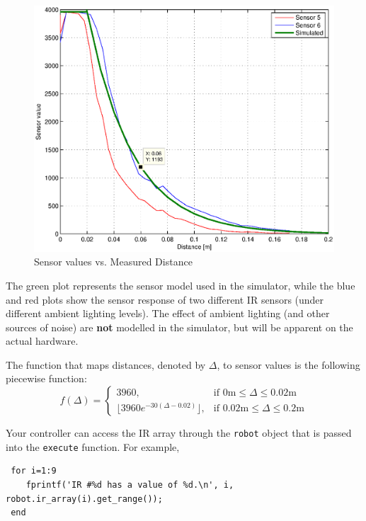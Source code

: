 \documentclass[10pt]{article}
\begin{document}
\begin{figure}[h]
 \centering
 \includegraphics[scale=0.5]{./ir_actual.eps}
 \caption{Sensor values vs. Measured Distance}
 \label{fig:irvalues}
\end{figure}

The green plot represents the sensor model used in the simulator, while the blue and red plots show the sensor response of two different IR sensors (under different ambient lighting levels). The effect of ambient lighting (and other sources of noise) are \textbf{not} modelled in the simulator, but will be apparent on the actual hardware.

The function that maps distances, denoted by $\Delta$, to sensor values is the following piecewise function:
\begin{equation}
 f(\Delta) =
\begin{cases}
3960, & \text{if } 0\text{m} \leq \Delta \leq 0.02\text{m} \\
\lfloor3960e^{-30(\Delta-0.02)}\rfloor, & \text{if } 0.02\text{m} \leq \Delta \leq 0.2\text{m}
\end{cases}
\end{equation}

Your controller can access the IR array through the \texttt{robot} object that is passed into the \texttt{execute} function. For example,
\begin{verbatim}
 for i=1:9
    fprintf('IR #%d has a value of %d.\n', i, robot.ir_array(i).get_range());
 end
\end{verbatim}
\end{document}

